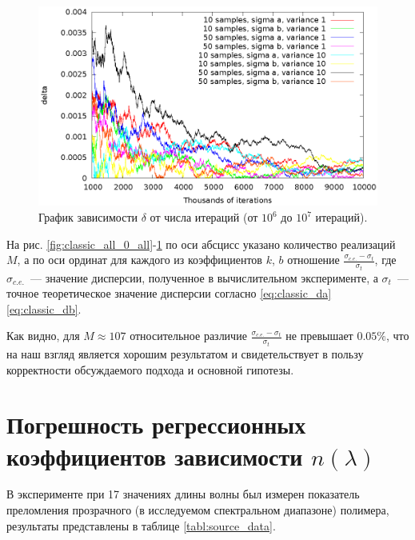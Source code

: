 \documentclass[11pt,a4paper]{article}
\theoremstyle{definition}
\begin{document}
\begin{figure}[h]
  \centering
  \includegraphics[scale=1.2]{figs/classic/variance_all_1000_all.eps}
  \caption{График зависимости $\delta$ от числа итераций (от $10^6$ до $10^7$ итераций).}
  \label{fig:classic_all_1000_all}
\end{figure}

На рис. \ref{fig:classic_all_0_all}-\ref{fig:classic_all_1000_all}
по оси абсцисс указано количество реализаций $M$, а по
оси ординат для каждого из коэффициентов $k$, $b$ отношение
$\frac{\sigma_{c.e.} - \sigma_t}{\sigma_t}$, где $\sigma_{c.e.}$~---
значение дисперсии, полученное в вычислительном эксперименте, а
$\sigma_{t}$~--- точное теоретическое значение дисперсии согласно 
\eqref{eq:classic_da} \eqref{eq:classic_db}.

Как видно, для $M \approx 107$ относительное различие $\frac{\sigma_{c.e.} - \sigma_t}{\sigma_t}$ не
превышает $0.05 \%$, что на наш взгляд является хорошим результатом и
свидетельствует в пользу корректности обсуждаемого подхода и основной
гипотезы.

\section{Погрешность регрессионных коэффициентов зависимости $n(\lambda)$}

В эксперименте при 17 значениях длины волны был измерен
показатель преломления прозрачного (в исследуемом спектральном
диапазоне) полимера, результаты представлены в таблице \ref{tabl:source_data}.
\end{document}
